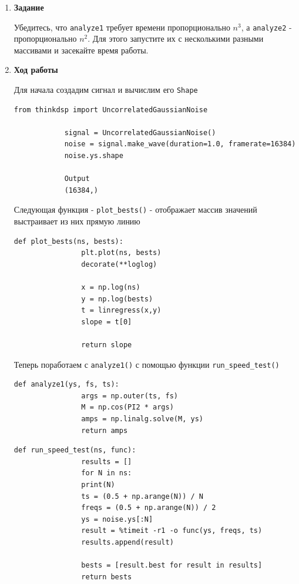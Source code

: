\documentclass[a4paper,12pt]{article}
\begin{document}
	\begin{enumerate} 
			
		\item \textbf{Задание}
		
		Убедитесь, что \texttt{analyze1} требует времени пропорционально \texttt{\(n^3\)}, а \texttt{analyze2} - пропорционально \texttt{\(n^2\)}. Для этого запустите их с несколькими разными массивами и засекайте время работы.
		
		\item \textbf{Ход работы}
		
		Для начала создадим сигнал и вычислим его \texttt{Shape}
		\begin{lstlisting}[caption=Создание сигнала и его \texttt{Shape}]
			from thinkdsp import UncorrelatedGaussianNoise
			
			signal = UncorrelatedGaussianNoise()
			noise = signal.make_wave(duration=1.0, framerate=16384)
			noise.ys.shape
			
			Output
			(16384,)
		\end{lstlisting}
		
		Следующая функция - \texttt{plot\_bests()} - отображает массив значений выстраивает из них прямую линию
		\begin{lstlisting}[caption=Функция \texttt{plot\_bests()}]
			def plot_bests(ns, bests):    
				plt.plot(ns, bests)
				decorate(**loglog)
				
				x = np.log(ns)
				y = np.log(bests)
				t = linregress(x,y)
				slope = t[0]
				
				return slope
		\end{lstlisting}
		
		Теперь поработаем с \texttt{analyze1()} с помощью функции \texttt{run\_speed\_test()}
		\begin{lstlisting}[caption=Функция \texttt{analyze1}]
			def analyze1(ys, fs, ts):
				args = np.outer(ts, fs)
				M = np.cos(PI2 * args)
				amps = np.linalg.solve(M, ys)
				return amps
		\end{lstlisting}
		
		
		\begin{lstlisting}[caption=Функция \texttt{run\_speed\_test()}]
			def run_speed_test(ns, func):
				results = []
				for N in ns:
				print(N)
				ts = (0.5 + np.arange(N)) / N
				freqs = (0.5 + np.arange(N)) / 2
				ys = noise.ys[:N]
				result = %timeit -r1 -o func(ys, freqs, ts)
				results.append(result)
				
				bests = [result.best for result in results]
				return bests
		\end{lstlisting}
		

\end{enumerate}
\end{document}
